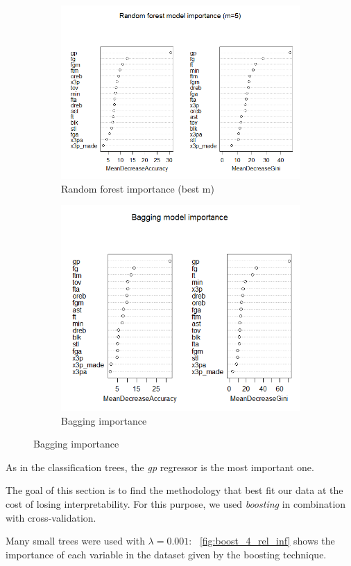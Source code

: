 \begin{figure}[h]
	\centering
	\begin{subfigure}{.5\textwidth}
		\centering
		\includegraphics[width=0.5\linewidth]{ImageFiles/Classification/best_for_500_var_imp_plot}
		\caption{Random forest importance (best m)}
		\label{fig:best_for_500_var_imp_plot}
	\end{subfigure}%
	\hfill
	\begin{subfigure}{.5\textwidth}
		\centering
		\includegraphics[width=0.5\linewidth]{ImageFiles/Classification/bagg_500_var_imp_plot}
		\caption{Bagging importance}
		\label{fig:bagg_500_var_imp_plot}
	\end{subfigure}
\end{figure}

\noindent
As in the classification trees, the \textit{gp} regressor is the most important one.

The goal of this section is to find the methodology that best fit our data at the cost of losing interpretability. For this purpose, we used \textit{boosting} in combination with cross-validation.

Many small trees were used with $\lambda = 0.001$: \Fig~\ref{fig:boost_4_rel_inf} shows the importance of each variable in the dataset given by the boosting technique.

